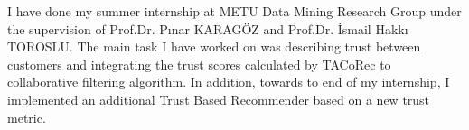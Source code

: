 I have done my summer internship at METU Data Mining Research Group under the supervision of Prof.Dr. Pınar KARAGÖZ and Prof.Dr. İsmail Hakkı TOROSLU. The main task I have worked on was describing trust between customers and integrating the trust scores calculated by TACoRec\cite{Tacorec} to collaborative filtering algorithm. In addition, towards to end of my internship, I implemented an additional Trust Based Recommender based on a new trust metric.